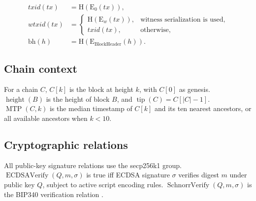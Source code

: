 \[
\begin{aligned}
  txid(tx) &= \mathrm{H}(\mathrm{E}_{0}(tx)),\\
  wtxid(tx) &=
    \begin{cases}
      \mathrm{H}(\mathrm{E}_{w}(tx)), & \text{witness serialization is used},\\
      txid(tx), & \text{otherwise},
    \end{cases}\\
  \mathrm{bh}(h) &= \mathrm{H}(\mathrm{E}_{\mathrm{BlockHeader}}(h)).
\end{aligned}
\]

\subsection{Chain context}

For a chain \(C\), \(C[k]\) is the block at height \(k\), with \(C[0]\) as
genesis. \(\operatorname{height}(B)\) is the height of block \(B\), and
\(\operatorname{tip}(C)=C[|C|-1]\). \(\operatorname{MTP}(C,k)\) is the median
timestamp of \(C[k]\) and its ten nearest ancestors, or all available ancestors
when \(k<10\).

\subsection{Cryptographic relations}

All public-key signature relations use the secp256k1 group.
\(\operatorname{ECDSAVerify}(Q,m,\sigma)\) is true iff ECDSA signature
\(\sigma\) verifies digest \(m\) under public key \(Q\), subject to active script
encoding rules. \(\operatorname{SchnorrVerify}(Q,m,\sigma)\) is the BIP340
verification relation \cite{bip-0066,bip-0340}.
